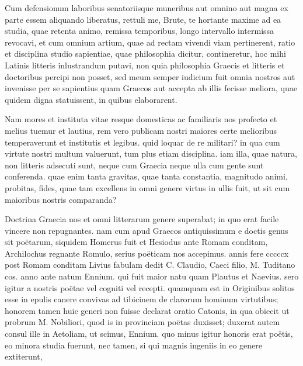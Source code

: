 
 Cum defensionum laboribus senatoriisque muneribus aut omnino aut magna ex parte essem aliquando liberatus, rettuli me, Brute, te hortante maxime ad ea studia, quae retenta animo, remissa temporibus, longo intervallo intermissa revocavi, et cum omnium artium, quae ad rectam vivendi viam pertinerent, ratio et disciplina studio sapientiae, quae philosophia dicitur, contineretur, hoc mihi Latinis litteris inlustrandum putavi, non quia philosophia Graecis et litteris et doctoribus percipi non posset, sed meum semper iudicium fuit omnia nostros aut invenisse per se sapientius quam Graecos aut accepta ab illis fecisse meliora, quae quidem digna statuissent, in quibus elaborarent.

 Nam mores et instituta vitae resque domesticas ac familiaris nos profecto et melius tuemur et lautius, rem vero publicam nostri maiores certe melioribus temperaverunt et institutis et legibus. quid loquar de re militari? in qua cum virtute nostri multum valuerunt, tum plus etiam disciplina. iam illa, quae natura, non litteris adsecuti sunt, neque cum Graecia neque ulla cum gente sunt conferenda. quae enim tanta gravitas, quae tanta constantia, magnitudo animi, probitas, fides, quae tam excellens in omni genere virtus in ullis fuit, ut sit cum maioribus nostris comparanda?

 Doctrina Graecia nos et omni litterarum genere superabat; in quo erat facile vincere non repugnantes. nam cum apud Graecos antiquissimum e doctis genus sit poëtarum, siquidem Homerus fuit et Hesiodus ante Romam conditam, Archilochus regnante Romulo, serius poëticam nos accepimus. annis fere cccccx post Romam conditam Livius fabulam dedit C. Claudio, Caeci filio, M. Tuditano cos. anno ante natum Ennium. qui fuit maior natu quam Plautus et Naevius. sero igitur a nostris poëtae vel cogniti vel recepti. quamquam est in Originibus solitos esse in epulis canere convivas ad tibicinem de clarorum hominum virtutibus; honorem tamen huic generi non fuisse declarat oratio Catonis, in qua obiecit ut probrum M. Nobiliori, quod is in provinciam poëtas duxisset; duxerat autem consul ille in Aetoliam, ut scimus, Ennium. quo minus igitur honoris erat poëtis, eo minora studia fuerunt, nec tamen, si qui magnis ingeniis in eo genere extiterunt,

